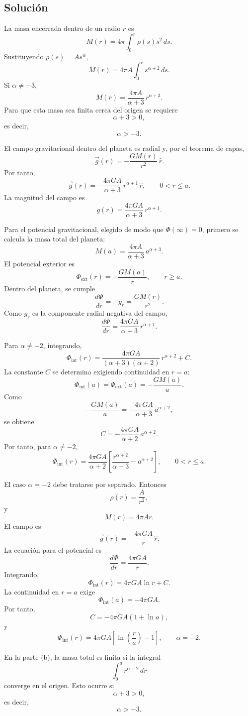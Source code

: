 \documentclass[a4paper]{article}
\begin{document}
\subsection{Solución}

La masa encerrada dentro de un radio $r$ es
$$
M(r)=4\pi\int_0^r \rho(s)s^2\,ds.
$$
Sustituyendo $\rho(s)=A s^\alpha$,
$$
M(r)=4\pi A\int_0^r s^{\alpha+2}\,ds.
$$
Si $\alpha\neq -3$,
$$
M(r)=\frac{4\pi A}{\alpha+3}\,r^{\alpha+3}.
$$
Para que esta masa sea finita cerca del origen se requiere
$$
\alpha+3>0,
$$
es decir,
$$
\alpha>-3.
$$

El campo gravitacional dentro del planeta es radial y, por el teorema de capas,
$$
\vec g(r)=-\frac{G M(r)}{r^2}\,\hat r.
$$
Por tanto,
$$
\vec g(r)=-\frac{4\pi G A}{\alpha+3}\,r^{\alpha+1}\,\hat r,
\qquad 0<r\le a.
$$
La magnitud del campo es
$$
g(r)=\frac{4\pi G A}{\alpha+3}\,r^{\alpha+1}.
$$

Para el potencial gravitacional, elegido de modo que $\Phi(\infty)=0$, primero se calcula la masa total del planeta:
$$
M(a)=\frac{4\pi A}{\alpha+3}\,a^{\alpha+3}.
$$
El potencial exterior es
$$
\Phi_{\text{ext}}(r)=-\frac{G M(a)}{r}, \qquad r\ge a.
$$
Dentro del planeta, se cumple
$$
\frac{d\Phi}{dr}=-g_r=\frac{G M(r)}{r^2}.
$$
Como $g_r$ es la componente radial negativa del campo,
$$
\frac{d\Phi}{dr}=\frac{4\pi G A}{\alpha+3}\,r^{\alpha+1}.
$$

Para $\alpha\neq -2$, integrando,
$$
\Phi_{\text{int}}(r)=\frac{4\pi G A}{(\alpha+3)(\alpha+2)}\,r^{\alpha+2}+C.
$$
La constante $C$ se determina exigiendo continuidad en $r=a$:
$$
\Phi_{\text{int}}(a)=\Phi_{\text{ext}}(a)=-\frac{G M(a)}{a}.
$$
Como
$$
-\frac{G M(a)}{a}=-\frac{4\pi G A}{\alpha+3}\,a^{\alpha+2},
$$
se obtiene
$$
C=-\frac{4\pi G A}{\alpha+2}\,a^{\alpha+2}.
$$
Por tanto, para $\alpha\neq -2$,
$$
\Phi_{\text{int}}(r)=
\frac{4\pi G A}{\alpha+2}
\left[
\frac{r^{\alpha+2}}{\alpha+3}-a^{\alpha+2}
\right],
\qquad 0<r\le a.
$$

El caso $\alpha=-2$ debe tratarse por separado. Entonces
$$
\rho(r)=\frac{A}{r^2},
$$
y
$$
M(r)=4\pi A r.
$$
El campo es
$$
\vec g(r)=-\frac{4\pi G A}{r}\,\hat r.
$$
La ecuación para el potencial es
$$
\frac{d\Phi}{dr}=\frac{4\pi G A}{r}.
$$
Integrando,
$$
\Phi_{\text{int}}(r)=4\pi G A\ln r+C.
$$
La continuidad en $r=a$ exige
$$
\Phi_{\text{int}}(a)=-4\pi G A.
$$
Por tanto,
$$
C=-4\pi G A\left(1+\ln a\right),
$$
y
$$
\Phi_{\text{int}}(r)=4\pi G A\left[\ln\left(\frac{r}{a}\right)-1\right],
\qquad \alpha=-2.
$$

En la parte (b), la masa total es finita si la integral
$$
\int_0^a r^{\alpha+2}\,dr
$$
converge en el origen. Esto ocurre si
$$
\alpha+3>0,
$$
es decir,
$$
\boxed{\alpha>-3.}
$$
\end{document}
